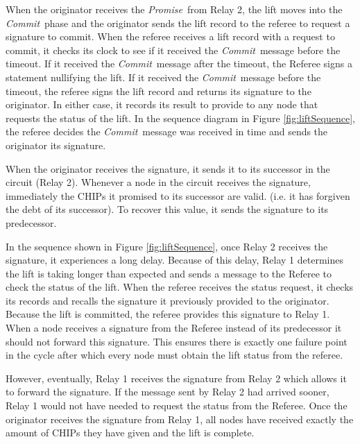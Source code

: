 \documentclass[runningheads]{llncs}
\newcommand{\promise}{\emph{Promise}}
\newcommand{\commit}{\emph{Commit}}
\newcommand{\figref}[1]{Figure \ref{#1}}
\newif\ifcomments
\newif\ifkylecomments
\newcommand{\egm}[1]{\ifcomments\textcolor{orange}{egm: #1}\fi}
\newcommand{\krs}[1]{\ifkylecomments\textcolor{blue}{krs: #1}\fi}
\begin{document}
When the originator receives the \promise\ from Relay 2, the lift moves into the \commit\ phase and the originator sends the lift record to the referee to request a signature to commit. When the referee receives a lift record with a request to commit, it checks its clock to see if it received the \commit\ message before the timeout. If it received the \commit\ message after the timeout, the Referee signs a statement nullifying the lift. If it received the \commit\ message before the timeout, the referee signs the lift record and returns its signature to the originator. In either case, it records its result to provide to any node that requests the status of the lift. In the sequence diagram in \figref{fig:liftSequence}, the referee decides the \commit\ message was received in time and sends the originator its signature.

When the originator receives the signature, it sends it to its successor in the circuit (Relay 2). Whenever a node in the circuit receives the signature, immediately the CHIPs it promised to its successor are valid. (i.e. it has forgiven the debt of its successor). 
To recover this value, it sends the signature to its predecessor.

In the sequence shown in \figref{fig:liftSequence}, once Relay 2 receives the signature, it experiences a long delay. Because of this delay, Relay 1 determines the lift is taking longer than expected and sends a message to the Referee to check the status of the lift. When the referee receives the status request, it checks its records and recalls the signature it previously provided to the originator. Because the lift is committed, the referee provides this signature to Relay 1. When a node receives a signature from the Referee instead of its predecessor it should not forward this signature. This ensures there is exactly one failure point in the cycle after which every node must obtain the lift status from the referee. 
\krs{Removed. This is covered elsewhere \egm{Move the following sentence to its respective section. Leave the protocol general here.}}
However, eventually, Relay 1 receives the signature from Relay 2 which allows it to forward the signature. If the message sent by Relay 2 had arrived sooner, Relay 1 would not have needed to request the status from the Referee. Once the originator receives the signature from Relay 1, all nodes have received exactly the amount of CHIPs they have given and the lift is complete.

\krs{removed and fixed. Much more concise now \egm{The following paragraph read as if it were out of place. We already have introducted the three roles, so the restatement here read strange. Maybe just fix the transition, or move/merge the following introductory text to the earlier introductory text.}}
\end{document}
